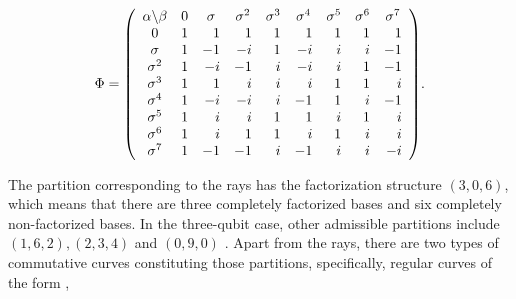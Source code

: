 \documentclass[quantumrep,article,submit,pdftex,moreauthors]{Definitions/mdpi}
\begin{document}
\begin{equation}
  \Phi
  =\left( 
  \begin{array}{ccccccccc}
    \alpha \backslash \beta & 0 & \sigma & \sigma ^{2} & \sigma ^{3} & \sigma
    ^{4} & \sigma ^{5} & \sigma ^{6} & \sigma ^{7} \\ 
    0 & \multicolumn{1}{r}{1} & \multicolumn{1}{r}{1} & \multicolumn{1}{r}{1} & 
    \multicolumn{1}{r}{1} & \multicolumn{1}{r}{1} & \multicolumn{1}{r}{1} & 
    \multicolumn{1}{r}{1} & \multicolumn{1}{r}{1} \\ 
    \sigma & \multicolumn{1}{r}{1} & \multicolumn{1}{r}{-1} & \multicolumn{1}{r}{
    -i} & \multicolumn{1}{r}{1} & \multicolumn{1}{r}{-i} & \multicolumn{1}{r}{i}
    & \multicolumn{1}{r}{i} & \multicolumn{1}{r}{-1} \\ 
    \sigma ^{2} & \multicolumn{1}{r}{1} & \multicolumn{1}{r}{-i} & 
    \multicolumn{1}{r}{-1} & \multicolumn{1}{r}{i} & \multicolumn{1}{r}{-i} & 
    \multicolumn{1}{r}{i} & \multicolumn{1}{r}{1} & \multicolumn{1}{r}{-1} \\ 
    \sigma ^{3} & \multicolumn{1}{r}{1} & \multicolumn{1}{r}{1} & 
    \multicolumn{1}{r}{i} & \multicolumn{1}{r}{i} & \multicolumn{1}{r}{i} & 
    \multicolumn{1}{r}{1} & \multicolumn{1}{r}{1} & \multicolumn{1}{r}{i} \\ 
    \sigma ^{4} & \multicolumn{1}{r}{1} & \multicolumn{1}{r}{-i} & 
    \multicolumn{1}{r}{-i} & \multicolumn{1}{r}{i} & \multicolumn{1}{r}{-1} & 
    \multicolumn{1}{r}{1} & \multicolumn{1}{r}{i} & \multicolumn{1}{r}{-1} \\ 
    \sigma ^{5} & \multicolumn{1}{r}{1} & \multicolumn{1}{r}{i} & 
    \multicolumn{1}{r}{i} & \multicolumn{1}{r}{1} & \multicolumn{1}{r}{1} & 
    \multicolumn{1}{r}{i} & \multicolumn{1}{r}{1} & \multicolumn{1}{r}{i} \\ 
    \sigma ^{6} & \multicolumn{1}{r}{1} & \multicolumn{1}{r}{i} & 
    \multicolumn{1}{r}{1} & \multicolumn{1}{r}{1} & \multicolumn{1}{r}{i} & 
    \multicolumn{1}{r}{1} & \multicolumn{1}{r}{i} & \multicolumn{1}{r}{i} \\ 
    \sigma ^{7} & \multicolumn{1}{r}{1} & \multicolumn{1}{r}{-1} & 
    \multicolumn{1}{r}{-1} & \multicolumn{1}{r}{i} & \multicolumn{1}{r}{-1} & 
    \multicolumn{1}{r}{i} & \multicolumn{1}{r}{i} & \multicolumn{1}{r}{-i}
  \end{array}
  \right).
\end{equation}

The partition corresponding to the rays has the factorization structure
$(3,0,6)$, which means that there are three completely factorized bases and six
completely non-factorized bases. In the three-qubit case, other admissible
partitions include $(1,6,2),(2,3,4)$ and $(0,9,0)$ \cite{factor1,factor2}. Apart
from the rays, there are two types of commutative curves constituting those
partitions, specifically, regular curves of the form \cite{GS2}, 
\end{document}
